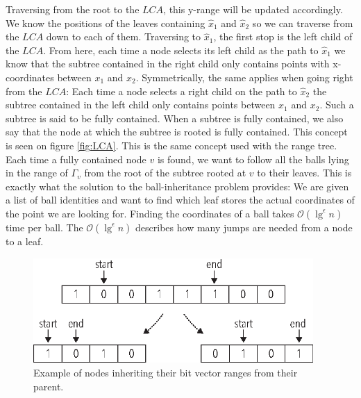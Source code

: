 Traversing from the root to the $LCA$, this y-range will be updated accordingly. We know the positions of the leaves containing $\hat{x}_1$ and $\hat{x}_2$ so we can traverse from the $LCA$ down to each of them. Traversing to $\hat{x}_1$, the first stop is the left child of the $LCA$. From here, each time a node selects its left child as the path to $\hat{x}_1$ we know that the subtree contained in the right child only contains points with x-coordinates between $x_1$ and $x_2$. Symmetrically, the same applies when going right from the $LCA$: Each time a node selects a right child on the path to $\hat{x}_2$ the subtree contained in the left child only contains points between $x_1$ and $x_2$. Such a subtree is said to be fully contained. When a subtree is fully contained, we also say that the node at which the subtree is rooted is fully contained. This concept is seen on figure \ref{fig:LCA}. This is the same concept used with the range tree. \\

Each time a fully contained node $v$ is found, we want to follow all the balls lying in the range of $\Gamma_v$ from the root of the subtree rooted at $v$ to their leaves. This is exactly what the solution to the ball-inheritance problem provides: We are given a list of ball identities and want to find which leaf stores the actual coordinates of the point we are looking for. Finding the coordinates of a ball takes $\mathcal{O}(\lg^\epsilon n)$ time per ball. The $\mathcal{O}(\lg^\epsilon n)$ describes how many jumps are needed from a node to a leaf.

\begin{figure}[h]
    \centering
    \includegraphics[width=0.95\textwidth]{pictures/bit_vector_split2.eps}
    \caption{Example of nodes inheriting their bit vector ranges from their parent.}
    \label{fig:bitvectorsplit}
\end{figure}


